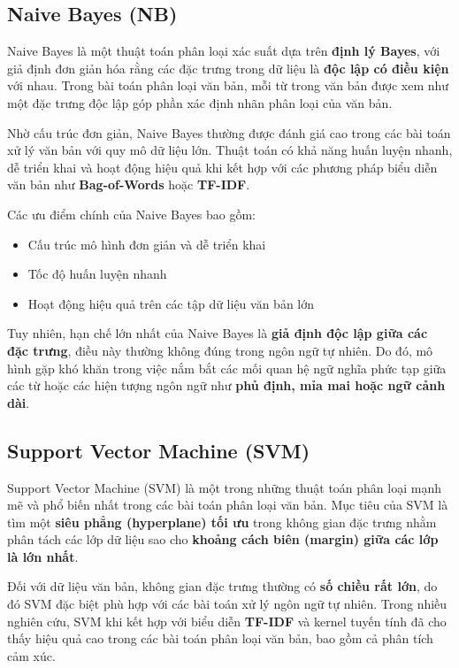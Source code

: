 \documentclass[14pt, a4paper]{report}
\begin{document}
\subsection{Naive Bayes (NB)}

Naive Bayes là một thuật toán phân loại xác suất dựa trên \textbf{định lý Bayes}, với giả định đơn giản hóa rằng các đặc trưng trong dữ liệu là \textbf{độc lập có điều kiện} với nhau. Trong bài toán phân loại văn bản, mỗi từ trong văn bản được xem như một đặc trưng độc lập góp phần xác định nhãn phân loại của văn bản.

Nhờ cấu trúc đơn giản, Naive Bayes thường được đánh giá cao trong các bài toán xử lý văn bản với quy mô dữ liệu lớn. Thuật toán có khả năng huấn luyện nhanh, dễ triển khai và hoạt động hiệu quả khi kết hợp với các phương pháp biểu diễn văn bản như \textbf{Bag-of-Words} hoặc \textbf{TF-IDF}.

Các ưu điểm chính của Naive Bayes bao gồm:

\begin{itemize}
    \item Cấu trúc mô hình đơn giản và dễ triển khai
    \item Tốc độ huấn luyện nhanh
    \item Hoạt động hiệu quả trên các tập dữ liệu văn bản lớn
\end{itemize}

Tuy nhiên, hạn chế lớn nhất của Naive Bayes là \textbf{giả định độc lập giữa các đặc trưng}, điều này thường không đúng trong ngôn ngữ tự nhiên. Do đó, mô hình gặp khó khăn trong việc nắm bắt các mối quan hệ ngữ nghĩa phức tạp giữa các từ hoặc các hiện tượng ngôn ngữ như \textbf{phủ định, mỉa mai hoặc ngữ cảnh dài}.

\subsection{Support Vector Machine (SVM)}

Support Vector Machine (SVM) là một trong những thuật toán phân loại mạnh mẽ và phổ biến nhất trong các bài toán phân loại văn bản. Mục tiêu của SVM là tìm một \textbf{siêu phẳng (hyperplane) tối ưu} trong không gian đặc trưng nhằm phân tách các lớp dữ liệu sao cho \textbf{khoảng cách biên (margin) giữa các lớp là lớn nhất}.

Đối với dữ liệu văn bản, không gian đặc trưng thường có \textbf{số chiều rất lớn}, do đó SVM đặc biệt phù hợp với các bài toán xử lý ngôn ngữ tự nhiên. Trong nhiều nghiên cứu, SVM khi kết hợp với biểu diễn \textbf{TF-IDF} và kernel tuyến tính đã cho thấy hiệu quả cao trong các bài toán phân loại văn bản, bao gồm cả phân tích cảm xúc.
\end{document}

